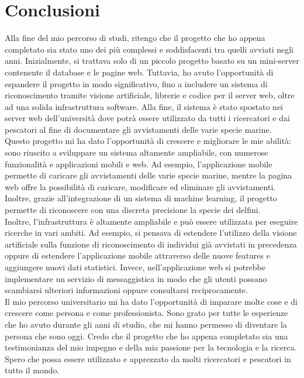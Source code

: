 \documentclass[a4paper,final,12pt]{report}
\begin{document}
\chapter{Conclusioni}
Alla fine del mio percorso di studi, ritengo che il progetto che ho appena completato sia stato uno dei più complessi e soddisfacenti tra quelli avviati negli anni. Inizialmente, si trattava solo di un piccolo progetto basato su un mini-server contenente il database e le pagine web. Tuttavia, ho avuto l'opportunità di espandere il progetto in modo significativo, fino a includere un sistema di riconoscimento tramite visione artificiale, librerie e codice per il server web, oltre ad una solida infrastruttura software. Alla fine, il sistema è stato spostato nei server web dell'università dove potrà essere utilizzato da tutti i ricercatori e dai pescatori al fine di documentare gli avvistamenti delle varie specie marine.\\

Questo progetto mi ha dato l'opportunità di crescere e migliorare le mie abilità: sono riuscito a sviluppare un sistema altamente ampliabile, con numerose funzionalità e applicazioni mobili e web. Ad esempio, l'applicazione mobile permette di caricare gli avvistamenti delle varie specie marine, mentre la pagina web offre la possibilità di caricare, modificare ed eliminare gli avvistamenti. Inoltre, grazie all'integrazione di un sistema di machine learning, il progetto permette di riconoscere con una discreta precisione la specie dei delfini.\\

Inoltre, l'infrastruttura è altamente ampliabile e può essere utilizzata per eseguire ricerche in vari ambiti. Ad esempio, si pensava di estendere l'utilizzo della visione artificiale sulla funzione di riconoscimento di individui già avvistati in precedenza oppure di estendere l'applicazione mobile attraverso delle nuove features e aggiungere nuovi dati statistici. Invece, nell'applicazione web si potrebbe implementare un servizio di messaggistica in modo che gli utenti possano scambiarsi ulteriori informazioni oppure consultarsi reciprocamente.\\

Il mio percorso universitario mi ha dato l'opportunità di imparare molte cose e di crescere come persona e come professionista. Sono grato per tutte le esperienze che ho avuto durante gli anni di studio, che mi hanno permesso di diventare la persona che sono oggi. Credo che il progetto che ho appena completato sia una testimonianza del mio impegno e della mia passione per la tecnologia e la ricerca. Spero che possa essere utilizzato e apprezzato da molti ricercatori e pescatori in tutto il mondo.
\end{document}
